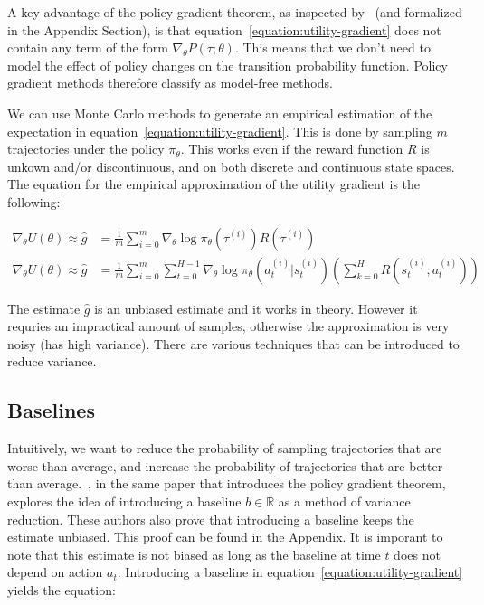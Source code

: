 \documentclass{../main.tex}{}
\begin{document}
A key advantage of the policy gradient theorem, as inspected by~\cite{Sutton1999} (and formalized in the Appendix Section), is that equation~\ref{equation:utility-gradient} does not contain any term of the form $\nabla_{\theta}P(\tau ; \theta)$. This means that we don't need to model the effect of policy changes on the transition probability function. Policy gradient methods therefore classify as model-free methods. 

We can use Monte Carlo methods to generate an empirical estimation of the expectation in equation~\ref{equation:utility-gradient}. This is done by sampling $m$ trajectories under the policy $\pi_{\theta}$. This works even if the reward function $R$ is unkown and/or discontinuous, and on both discrete and continuous state spaces. The equation for the empirical approximation of the utility gradient is the following:

\begin{equation}\label{equation:expectance-gradient-vanilla}
\begin{aligned}
\nabla_{\theta}U(\theta) \approx \hat{g} &= \frac{1}{m} \sum_{i = 0}^{m} \nabla_{\theta} \log \pi_{\theta}(\tau^{(i)}) R(\tau^{(i)}) \\
\nabla_{\theta}U(\theta) \approx \hat{g} &= \frac{1}{m} \sum_{i = 0}^{m} \sum_{t=0}^{H-1} \nabla_{\theta} \log \pi_{\theta}(a_t^{(i)} | s_t^{(i)}) (\sum_{k=0}^{H}R(s_t^{(i)}, a_t^{(i)}))
\end{aligned}
\end{equation}

The estimate $\hat{g}$ is an unbiased estimate and it works in theory. However it requries an impractical amount of samples, otherwise the approximation is very noisy (has high variance). There are various techniques that can be introduced to reduce variance.

\subsection{Baselines}

Intuitively, we want to reduce the probability of sampling trajectories that are worse than average, and increase the probability of trajectories that are better than average.~\cite{Williams1992}, in the same paper that introduces the policy gradient theorem, explores the idea of introducing a baseline $b \in \mathbb{R}$ as a method of variance reduction. These authors also prove that introducing a baseline keeps the estimate unbiased. This proof can be found in the Appendix. It is imporant to note that this estimate is not biased as long as the baseline at time $t$ does not depend on action $a_t$. Introducing a baseline in equation~\ref{equation:utility-gradient} yields the equation:
\end{document}
